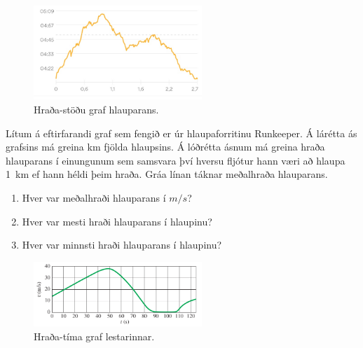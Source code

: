 \begin{enumerate}[label = \textbf{Dæmi \thechapter.\arabic*.}]
\begin{minipage}{\linewidth}

\begin{figure}
\vspace{-0.5cm}
\centering
\includegraphics[width=2.5in]{images/hlaupa.jpg}
    \caption{Hraða-stöðu graf hlauparans.}
    \label{fig:myRunkeeper}

\end{figure}

\item Lítum á eftirfarandi graf sem fengið er úr hlaupaforritinu Runkeeper. Á lárétta ás grafsins má greina \si{km} fjölda hlaupsins. Á lóðrétta ásnum má greina hraða hlauparans í einungunum sem samsvara því hversu fljótur hann væri að hlaupa \SI{1}{km} ef hann héldi þeim hraða. Gráa línan táknar meðalhraða hlauparans.
\begin{enumerate}[label = \textbf{(\alph*)}]
    \item Hver var meðalhraði hlauparans í $\si{m/s}$?
    \item Hver var mesti hraði hlauparans í hlaupinu?
    \item Hver var minnsti hraði hlauparans í hlaupinu?
\end{enumerate}

\end{minipage}

\vspace{1cm}

\begin{minipage}{\linewidth}

\begin{figure}
\centering
\includegraphics[width=2.5in]{images/lest-graf.png}
    \caption{Hraða-tíma graf lestarinnar.}
    \label{fig:lest-hradi}

\end{figure}


\end{minipage}
\end{enumerate}
